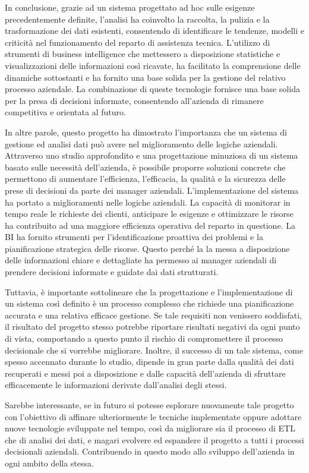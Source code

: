 In conclusione, grazie ad un sistema progettato ad hoc sulle esigenze precedentemente definite, l'analisi ha coinvolto la raccolta, la pulizia e la trasformazione dei dati esistenti, consentendo di identificare le tendenze, modelli e criticità nel funzionamento del reparto di assistenza tecnica. L'utilizzo di strumenti di business intelligence che mettessero a disposizione statistiche e visualizzazioni delle informazioni così ricavate, ha facilitato la comprensione delle dinamiche sottostanti e ha fornito una base solida per la gestione del relativo processo aziendale. La combinazione di queste tecnologie fornisce una base solida per la presa di decisioni informate, consentendo all'azienda di rimanere competitiva e orientata al futuro.

In altre parole, questo progetto ha dimostrato l'importanza che un sistema di gestione ed analisi dati può avere nel miglioramento delle logiche aziendali. Attraverso uno studio approfondito e una progettazione minuziosa di un sistema basato sulle necessità dell'azienda, è possibile proporre soluzioni concrete che permettono di aumentare l'efficienza, l'efficacia, la qualità e la sicurezza delle prese di decisioni da parte dei manager aziendali. L'implementazione del sistema ha portato a miglioramenti nelle logiche aziendali. La capacità di monitorar in tempo reale le richieste dei clienti, anticipare le esigenze e ottimizzare le risorse ha contribuito ad una maggiore efficienza operativa del reparto in questione. La BI ha fornito strumenti per l'identificazione proattiva dei problemi e la pianificazione strategica delle risorse. Questo perché la la messa a disposizione delle informazioni chiare e dettagliate ha permesso ai manager aziendali di prendere decisioni informate e guidate dai dati strutturati.

Tuttavia, è importante sottolineare che la progettazione e l'implementazione di un sistema così definito è un processo complesso che richiede una pianificazione accurata e una relativa efficace gestione. Se tale requisiti non venissero soddisfati, il risultato del progetto stesso potrebbe riportare risultati negativi da ogni punto di vista, comportando a questo punto il rischio di compromettere il processo decisionale che si vorrebbe migliorare. Inoltre, il successo di un tale sistema, come spesso accennato durante lo studio, dipende in gran parte dalla qualità dei dati recuperati e messi poi a disposizione e dalle capacità dell'azienda di sfruttare efficacemente le informazioni derivate dall'analisi degli stessi.

Sarebbe interessante, se in futuro si potesse esplorare nuovamente tale progetto con l'obiettivo di affinare ulteriormente le tecniche implementate oppure adottare nuove tecnologie sviluppate nel tempo, così da migliorare sia il processo di ETL che di analisi dei dati, e magari evolvere ed espandere il progetto a tutti i processi decisionali aziendali. Contribuendo in questo modo allo sviluppo dell'azienda in ogni ambito della stessa.